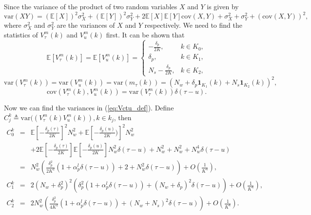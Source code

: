 \documentclass[draftclsnofoot,onecolumn,12pt]{IEEEtran}
\begin{document}
Since the variance of the product of two random variables $X$ and $Y$ is given by
  \begin{equation}
    \mathrm{var}(XY) = (\mathbb{E}[X])^2 \sigma_X^2 + (\mathbb{E}[Y])^2 \sigma_Y^2 + 2\mathbb{E}[X]\mathbb{E}[Y]\mathrm{cov}(X,Y) + \sigma_X^2 + \sigma_Y^2 + \left(\mathrm{cov}(X,Y)\right)^2,
    \label{eq:varXY}
  \end{equation}
  where $\sigma_X^2$ and $\sigma_Y^2$ are the variances of $X$ and $Y$ respectively. We need to find the statistics of $V_{\tau}^m(k)$ and $V_{u}^m(k)$ first. It can be shown that
  \begin{equation}
    \mathbb{E}[V_{\tau}^m(k)] = \mathbb{E}[V_{u}^m(k)] = \begin{cases}
	    -\frac{\delta_p}{2K}, & k \in K_0,\\
	\delta_p, & k \in K_1, \\
	N_s - \frac{\delta_p}{2K}, & k \in K_2,
      \end{cases} 
  \end{equation}
\begin{equation}
      \mathrm{var}(V_\tau^m(k)) = \mathrm{var}(V_u^m(k)) = \mathrm{var}(m_\tau(k)) = (N_w + \delta_p \mathbf{1}_{K_1}(k) + N_s \mathbf{1}_{K_2}(k))^2,
\end{equation}
\begin{equation}
      \mathrm{cov}\left(V_\tau^m(k), V_u^m(k) \right) = \mathrm{var}(V_\tau^m(k)) \delta(\tau - u).
    \label{eq:EVtmk}
  \end{equation}

  Now we can find the variances in (\ref{eq:Vctu_def}).
  Define $C_j^k \triangleq \mathrm{var}(\left(V_{\tau}^m(k) V_{u}^m(k) \right), k \in k_j$, then
\begin{eqnarray}
	C_0^k &=& \mathbb{E}\left[-\frac{\delta_p(\tau)}{2K}\right]^2 N_w^2 +  \mathbb{E}\left[-\frac{\delta_p(u)}{2K})\right]^2 N_w^2 \nonumber \\
	& & + 2\mathbb{E}\left[-\frac{\delta_p(\tau)}{2K}\right] \mathbb{E}\left[-\frac{\delta_p(u)}{2K}\right] N_w^2 \delta(\tau - u) + N_w^2 + N_w^2 + N_w^4\delta(\tau-u) \nonumber \\
&=& N_w^2 \left( \frac{\delta_p^2}{2K^2} \left( 1 + \alpha_p^l \delta(\tau-u) \right) + 2 + N_w^2 \delta(\tau - u) \right) + O(\frac{1}{K^4}),\label{eq:C_0} \\
C_1^k &=&  2\left( N_w + \delta_p^2\right)^2 \left( \delta_p^2 \left(1 + \alpha_p^l \delta(\tau-u) \right) + (N_w + \delta_p)^2 \delta(\tau-u) \right) + O(\frac{1}{K^4}),\label{eq:C_1} \\
C_2^k &=&  2N_w^2 \left( \frac{\delta_p^2}{4K^2} \left( 1 + \alpha_p^l \delta(\tau - u) \right) + (N_w + N_s)^2 \delta(\tau-u) \right) + O(\frac{1}{K^4}).\label{eq:C_2}
\end{eqnarray}
\end{document}
